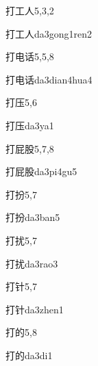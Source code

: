 \begin{entry}{打工人}{5,3,2}
  \begin{phonetics}{打工人}{da3gong1ren2}
  \end{phonetics}
\end{entry}

\begin{entry}{打电话}{5,5,8}
  \begin{phonetics}{打电话}{da3dian4hua4}
  \end{phonetics}
\end{entry}

\begin{entry}{打压}{5,6}
  \begin{phonetics}{打压}{da3ya1}
  \end{phonetics}
\end{entry}

\begin{entry}{打屁股}{5,7,8}
  \begin{phonetics}{打屁股}{da3pi4gu5}
  \end{phonetics}
\end{entry}

\begin{entry}{打扮}{5,7}
  \begin{phonetics}{打扮}{da3ban5}
  \end{phonetics}
\end{entry}

\begin{entry}{打扰}{5,7}
  \begin{phonetics}{打扰}{da3rao3}
  \end{phonetics}
\end{entry}

\begin{entry}{打针}{5,7}
  \begin{phonetics}{打针}{da3zhen1}
  \end{phonetics}
\end{entry}

\begin{entry}{打的}{5,8}
  \begin{phonetics}{打的}{da3di1}
  \end{phonetics}
\end{entry}

